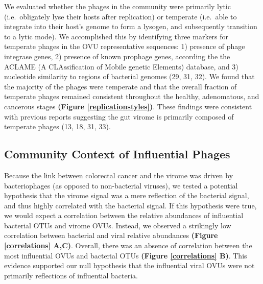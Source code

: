 \documentclass[12pt,]{article}
\begin{document}
We evaluated whether the phages in the community were primarily lytic
(i.e.~obligately lyse their hosts after replication) or temperate
(i.e.~able to integrate into their host's genome to form a lysogen, and
subsequently transition to a lytic mode). We accomplished this by
identifying three markers for temperate phages in the OVU representative
sequences: 1) presence of phage integrase genes, 2) presence of known
prophage genes, according the the ACLAME (A CLAssification of Mobile
genetic Elements) database, and 3) nucleotide similarity to regions of
bacterial genomes (29, 31, 32). We found that the majority of the phages
were temperate and that the overall fraction of temperate phages
remained consistent throughout the healthy, adenomatous, and cancerous
stages \textbf{(Figure \ref{replicationstyles})}. These findings were
consistent with previous reports suggesting the gut virome is primarily
composed of temperate phages (13, 18, 31, 33).

\subsection{Community Context of Influential
Phages}\label{community-context-of-influential-phages}

Because the link between colorectal cancer and the virome was driven by
bacteriophages (as opposed to non-bacterial viruses), we tested a
potential hypothesis that the virome signal was a mere reflection of the
bacterial signal, and thus highly correlated with the bacterial signal.
If this hypothesis were true, we would expect a correlation between the
relative abundances of influential bacterial OTUs and virome OVUs.
Instead, we observed a strikingly low correlation between bacterial and
viral relative abundances \textbf{(Figure \ref{correlations} A,C)}.
Overall, there was an absence of correlation between the most
influential OVUs and bacterial OTUs \textbf{(Figure \ref{correlations}
B)}. This evidence supported our null hypothesis that the influential
viral OVUs were not primarily reflections of influential bacteria.
\end{document}
